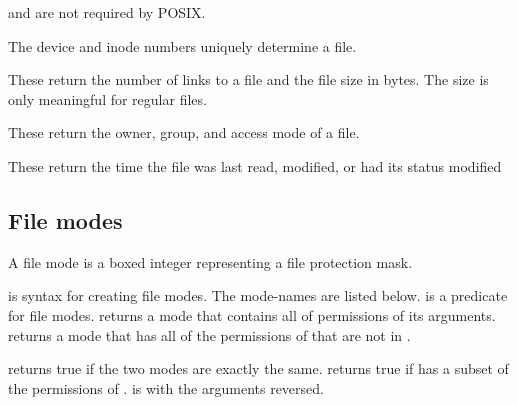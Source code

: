 \noindent
{} and  are not required by POSIX.

\begin{protos}
\end{protos}
\noindent
The device and inode numbers uniquely determine a file.

\begin{protos}
\end{protos}
\noindent
These return the number of links to a file and the file size in bytes.
The size is only meaningful for regular files.

\begin{protos}
\end{protos}
\noindent
These return the owner, group, and access mode of a file.

\begin{protos}
\end{protos}
\noindent
These return the time the file was last read, modified, or had its
 status modified

\subsection{File modes}

A file mode is a boxed integer representing a file protection mask.

\begin{protos}
\end{protos}
\noindent
{} is syntax for creating file modes.
The mode-names are listed below.
 is a predicate for file modes.
 returns a mode that contains all of permissions of
 its arguments.
 returns a mode that has all of the permissions of
  that are not in .

\begin{protos}
\end{protos}
\noindent
{} returns true if the two modes are exactly the same.
 returns true if  has a subset
 of the permissions of .
 is  with the arguments reversed.

